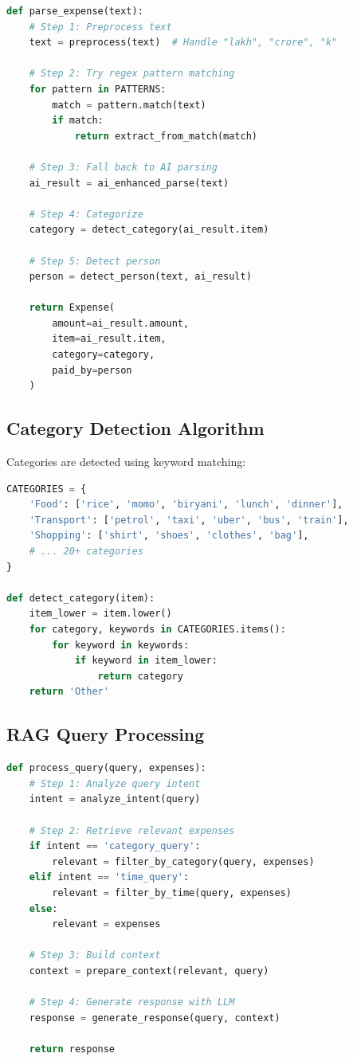 \begin{lstlisting}[language=Python, caption=NLP Parsing Algorithm]
def parse_expense(text):
    # Step 1: Preprocess text
    text = preprocess(text)  # Handle "lakh", "crore", "k"
    
    # Step 2: Try regex pattern matching
    for pattern in PATTERNS:
        match = pattern.match(text)
        if match:
            return extract_from_match(match)
    
    # Step 3: Fall back to AI parsing
    ai_result = ai_enhanced_parse(text)
    
    # Step 4: Categorize
    category = detect_category(ai_result.item)
    
    # Step 5: Detect person
    person = detect_person(text, ai_result)
    
    return Expense(
        amount=ai_result.amount,
        item=ai_result.item,
        category=category,
        paid_by=person
    )
\end{lstlisting}

\subsection{Category Detection Algorithm}

Categories are detected using keyword matching:

\begin{lstlisting}[language=Python, caption=Category Detection Algorithm]
CATEGORIES = {
    'Food': ['rice', 'momo', 'biryani', 'lunch', 'dinner'],
    'Transport': ['petrol', 'taxi', 'uber', 'bus', 'train'],
    'Shopping': ['shirt', 'shoes', 'clothes', 'bag'],
    # ... 20+ categories
}

def detect_category(item):
    item_lower = item.lower()
    for category, keywords in CATEGORIES.items():
        for keyword in keywords:
            if keyword in item_lower:
                return category
    return 'Other'
\end{lstlisting}

\subsection{RAG Query Processing}

\begin{lstlisting}[language=Python, caption=RAG Query Processing]
def process_query(query, expenses):
    # Step 1: Analyze query intent
    intent = analyze_intent(query)
    
    # Step 2: Retrieve relevant expenses
    if intent == 'category_query':
        relevant = filter_by_category(query, expenses)
    elif intent == 'time_query':
        relevant = filter_by_time(query, expenses)
    else:
        relevant = expenses
    
    # Step 3: Build context
    context = prepare_context(relevant, query)
    
    # Step 4: Generate response with LLM
    response = generate_response(query, context)
    
    return response
\end{lstlisting}
